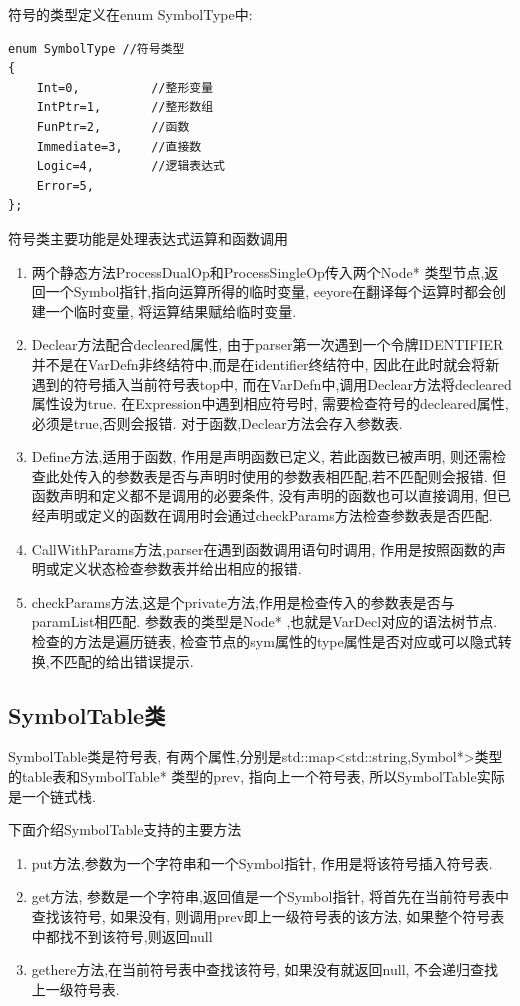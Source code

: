 \documentclass[UTF8]{article}
\begin{document}
符号的类型定义在enum SymbolType中:
\begin{lstlisting}
enum SymbolType //符号类型
{
    Int=0,          //整形变量
    IntPtr=1,       //整形数组
    FunPtr=2,       //函数
    Immediate=3,    //直接数
    Logic=4,        //逻辑表达式
    Error=5,        
};
\end{lstlisting}
符号类主要功能是处理表达式运算和函数调用
\begin{enumerate}[(1)]
\item 两个静态方法ProcessDualOp和ProcessSingleOp传入两个Node* 类型节点,返回一个Symbol指针,指向运算所得的临时变量, eeyore在翻译每个运算时都会创建一个临时变量, 将运算结果赋给临时变量.
\item Declear方法配合decleared属性, 由于parser第一次遇到一个令牌IDENTIFIER并不是在VarDefn非终结符中,而是在identifier终结符中, 因此在此时就会将新遇到的符号插入当前符号表top中, 而在VarDefn中,调用Declear方法将decleared属性设为true. 在Expression中遇到相应符号时, 需要检查符号的decleared属性,必须是true,否则会报错. 对于函数,Declear方法会存入参数表.
\item Define方法,适用于函数, 作用是声明函数已定义, 若此函数已被声明, 则还需检查此处传入的参数表是否与声明时使用的参数表相匹配,若不匹配则会报错. 但函数声明和定义都不是调用的必要条件, 没有声明的函数也可以直接调用, 但已经声明或定义的函数在调用时会通过checkParams方法检查参数表是否匹配.
\item CallWithParams方法,parser在遇到函数调用语句时调用, 作用是按照函数的声明或定义状态检查参数表并给出相应的报错.
\item checkParams方法,这是个private方法,作用是检查传入的参数表是否与paramList相匹配. 参数表的类型是Node* ,也就是VarDecl对应的语法树节点. 检查的方法是遍历链表, 检查节点的sym属性的type属性是否对应或可以隐式转换,不匹配的给出错误提示.
\end{enumerate}

\subsection{SymbolTable类}
SymbolTable类是符号表, 有两个属性,分别是std::map<std::string,Symbol*>类型的table表和SymbolTable* 类型的prev, 指向上一个符号表, 所以SymbolTable实际是一个链式栈.

下面介绍SymbolTable支持的主要方法
\begin{enumerate}[(1)]
\item put方法,参数为一个字符串和一个Symbol指针, 作用是将该符号插入符号表.
\item get方法, 参数是一个字符串,返回值是一个Symbol指针, 将首先在当前符号表中查找该符号, 如果没有, 则调用prev即上一级符号表的该方法, 如果整个符号表中都找不到该符号,则返回null
\item gethere方法,在当前符号表中查找该符号, 如果没有就返回null, 不会递归查找上一级符号表.
\end{enumerate}
\end{document}
